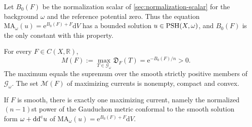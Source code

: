 Let $B_0(F)$ be the normalization scalar of \cref{sec:normalization-scalar} for the background $\omega$ and the reference potential zero. Thus the equation
$\mathrm{MA}_\omega(u)=\mathrm{e}^{B_0(F)+F}\mathrm{d}V$
has a bounded solution $u\in\mathrm{PSH}(X,\omega)$, and $B_0(F)$ is the only constant with this property.

\begin{theorem}\label{thm:weak-gaud-compact-duality}
For every $F\in C(X,\mathbb R)$,
\begin{equation}\label{eq:weak-gaud-max-formula}
 M(F):=\max_{T\in\mathscr G_\omega}\mathfrak D_F(T)
                      =\mathrm{e}^{-B_0(F)/n}>0.
\end{equation}
The maximum equals the supremum over the smooth strictly positive members of $\mathscr G_\omega$. The set $\mathscr M(F)$ of maximizing currents is nonempty, compact and convex.

If $F$ is smooth, there is exactly one maximizing current, namely the normalized $(n-1)$st power of the Gauduchon metric conformal to the smooth solution form $\omega+\mathrm{dd}^{\mathrm{c}} u$ of $\mathrm{MA}_\omega(u)=\mathrm{e}^{B_0(F)+F}\mathrm{d}V$.
\end{theorem}
